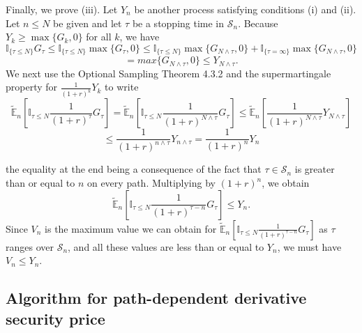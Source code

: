 \documentclass[c, dvipsnames, 8pt]{beamer}
\begin{document}
\begin{frame}[shrink=5]

\frametitle{\insertsection} 
\framesubtitle{\insertsubsection} 
Finally, we prove (iii). Let $Y_n$ be another process satisfying conditions (i) and (ii). Let $n \le N$ be given and let $\tau$ be a stopping time in $\mathcal{S}_n$. Because $Y_k \ge \max\{G_k,0\}$ for all $k$, we have
$$\mathbb{I}_{\{\tau\le N\}}G_{\tau}\le\mathbb{I}_{\{\tau\le N\}}\max\{G_{\tau},0\}\le\mathbb{I}_{\{\tau\le N\}}\max\{G_{N\wedge\tau},0\}+\mathbb{I}_{\{\tau=\infty\}}\max\{G_{N\wedge\tau},0\}$$
\begin{equation}\label{key}
=max\{G_{N\wedge\tau},0\}\le Y_{N\wedge\tau}.
\end{equation}
We next use the Optional Sampling Theorem 4.3.2 and the supermartingale property for $\frac{1}{(1+r)^k}Y_k$ to write
$$\widetilde{\mathbb{E}}_{n}\left[\mathbb{I}_{\tau\le N}\frac{1}{(1+r)^{\tau}}G_{\tau}\right]=\widetilde{\mathbb{E}}_{n}\left[\mathbb{I}_{\tau\le N}\frac{1}{(1+r)^{N\wedge\tau}}G_{\tau}\right]\le\widetilde{\mathbb{E}}_{n}\left[\frac{1}{(1+r)^{N\wedge\tau}}Y_{N\wedge\tau}\right]$$
\begin{equation}\label{key}
\le\frac{1}{(1+r)^{n\wedge\tau}}Y_{n\wedge\tau}=\frac{1}{(1+r)^{n}}Y_{n}
\end{equation}

the equality at the end being a consequence of the fact that $\tau\in\mathcal{S}_n$ is greater than or equal to $n$ on every path. Multiplying by $(1+r)^n$, we obtain
\begin{equation}\label{key}
\widetilde{\mathbb{E}}_{n}\left[\mathbb{I}_{\tau\le N}\frac{1}{(1+r)^{\tau-n}}G_{\tau}\right]\le Y_n.
\end{equation}
Since $V_n$ is the maximum value we can obtain for $\widetilde{\mathbb{E}}_{n}\left[\mathbb{I}_{\tau\le N}\frac{1}{(1+r)^{\tau-n}}G_{\tau}\right]$ as $\tau$ ranges over $\mathcal{S}_n$, and all these values are less than or equal to $Y_n$, we must 
have $V_n \le Y_n$. 

\end{frame}


\subsection{Algorithm for path-dependent derivative security price}
\end{document}

